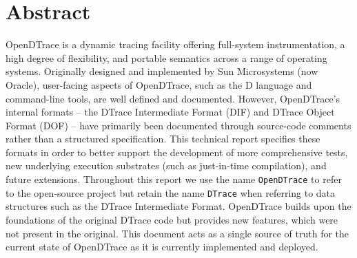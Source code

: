 \section*{Abstract}

OpenDTrace is a dynamic tracing facility offering full-system instrumentation,
a high degree of flexibility, and portable semantics across a range of
operating systems.
Originally designed and implemented by Sun Microsystems (now Oracle),
user-facing aspects of OpenDTrace, such as the D language and
command-line tools,
are well defined and documented.
However, OpenDTrace's internal formats --
the DTrace Intermediate Format (DIF) and
DTrace Object Format (DOF) -- have primarily been documented through
source-code comments rather than a structured specification.
This technical report specifies these formats in order to better support the
development of more comprehensive tests, new underlying execution substrates
(such as just-in-time compilation), and future extensions.
Throughout this report we use the name \texttt{OpenDTrace} to refer
to the open-source project but retain the name \texttt{DTrace} when
referring to data structures such as the DTrace Intermediate Format.
OpenDTrace builds upon the foundations of the original DTrace code but
provides new features, which were not present in the original.
This document acts as a single source of truth for the current state
of OpenDTrace as it is currently implemented and deployed.

